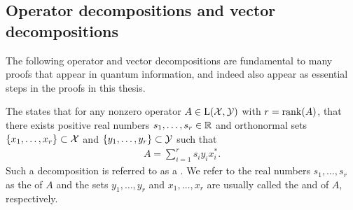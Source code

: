%

\subsection{Operator decompositions and vector decompositions}

The following operator and vector decompositions are fundamental to many proofs that appear in quantum information, and indeed also appear as essential steps in the proofs in this thesis. 

The  states that for any nonzero operator $A \in \mathrm{L}(\mathcal{X},\mathcal{Y})$ with $r = \operatorname{rank}(A)$, that there exists positive real numbers $s_1, \ldots, s_r \in \mathbb{R}$ and orthonormal sets $\{x_1, \ldots, x_r\} \subset \mathcal{X}$ and $\{y_1, \ldots, y_r\} \subset \mathcal{Y}$ such that 
\begin{align}
	A = \sum_{i=1}^r s_i y_i x_i^*.
\end{align}
Such a decomposition is referred to as a . We refer to the real numbers $s_1, \ldots, s_r$ as the  of $A$ and the sets $y_1, \ldots, y_r$ and $x_1, \ldots, x_r$ are usually called the  and  of $A$, respectively. 

